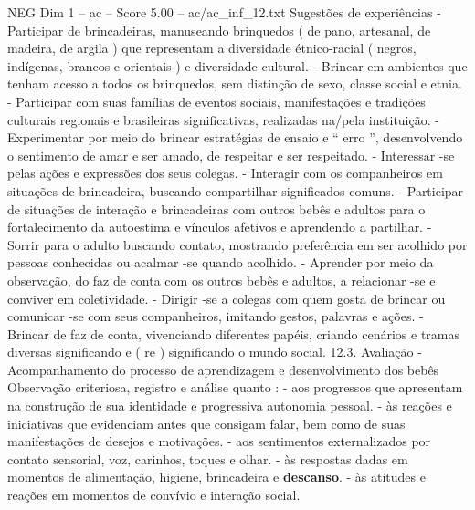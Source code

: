 \begin{textsample}{NEG Dim 1 – ac – Score 5.00 – ac/ac\_inf\_12.txt}
Sugestões de experiências - Participar de brincadeiras, manuseando brinquedos ( de pano, artesanal, de madeira, de argila ) que representam a diversidade étnico-racial ( negros, indígenas, brancos e orientais ) e diversidade cultural. - Brincar em ambientes que tenham acesso a todos os brinquedos, sem distinção de sexo, classe social e etnia. - Participar com suas famílias de eventos sociais, manifestações e tradições culturais regionais e brasileiras significativas, realizadas na/pela instituição. - Experimentar por meio do brincar estratégias de ensaio e “ erro ”, desenvolvendo o sentimento de amar e ser amado, de respeitar e ser respeitado. - Interessar -se pelas ações e expressões dos seus colegas. - Interagir com os companheiros em situações de brincadeira, buscando compartilhar significados comuns. - Participar de situações de interação e brincadeiras com outros bebês e adultos para o fortalecimento da autoestima e vínculos afetivos e aprendendo a partilhar. - Sorrir para o adulto buscando contato, mostrando preferência em ser acolhido por pessoas conhecidas ou acalmar -se quando acolhido. - Aprender por meio da observação, do faz de conta com os outros bebês e adultos, a relacionar -se e conviver em coletividade. - Dirigir -se a colegas com quem gosta de brincar ou comunicar -se com seus companheiros, imitando gestos, palavras e ações. - Brincar de faz de conta, vivenciando diferentes papéis, criando cenários e tramas diversas significando e ( re ) significando o mundo social. 12.3.
Avaliação - Acompanhamento do processo de aprendizagem e desenvolvimento dos bebês Observação criteriosa, registro e análise quanto : - aos progressos que apresentam na construção de sua identidade e progressiva autonomia pessoal. - às reações e iniciativas que evidenciam antes que consigam falar, bem como de suas manifestações de desejos e motivações. - aos sentimentos externalizados por contato sensorial, voz, carinhos, toques e olhar. - às respostas dadas em momentos de alimentação, higiene, brincadeira e \textbf{descanso}. - às atitudes e reações em momentos de convívio e interação social.

\end{textsample}
